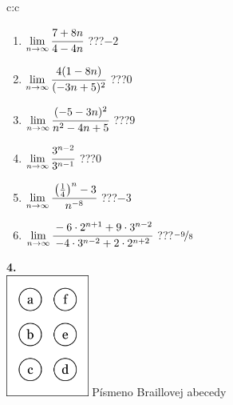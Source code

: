 \documentclass[10pt]{report}
\begin{document}
\begin{tabular}{c:c}
\begin{minipage}[c][104.5mm][t]{0.5\linewidth}
\begin{center}
\begin{minipage}{0.79\linewidth}
\begin{center}
\begin{varwidth}{\linewidth}
\begin{enumerate}
\normalsize
\item $\lim\limits_{n\to\infty}\cfrac{7+8n}{4-4n}$\quad \dotfill\; ???\;\dotfill \quad $-2$
\item $\lim\limits_{n\to\infty}\cfrac{4(1-8n)}{(-3n+5)^2}$\quad \dotfill\; ???\;\dotfill \quad $0$
\item $\lim\limits_{n\to\infty}\cfrac{(-5-3n)^2}{n^2-4n+5}$\quad \dotfill\; ???\;\dotfill \quad $9$
\item $\lim\limits_{n\to\infty}\cfrac{3^{n-2}}{3^{n-1}}$\quad \dotfill\; ???\;\dotfill \quad $0$
\item $\lim\limits_{n\to\infty}\cfrac{\left(\frac{1}{4}\right)^n -3}{n^{-8}}$\quad \dotfill\; ???\;\dotfill \quad $-3$
\item $\lim\limits_{n\to\infty}\cfrac{-6\cdot 2^{n+1}+9\cdot 3^{n-2}}{-4\cdot 3^{n-2}+2\cdot 2^{n+2}}$\quad \dotfill\; ???\;\dotfill \quad $\nicefrac{-9}{8}$
\end{enumerate}
\end{varwidth}
\end{center}
\end{minipage}
\begin{minipage}{0.20\linewidth}
\begin{center}
{\Huge\bfseries 4.} \\[2mm]
\includegraphics[height=40mm]{../images/braille.png}
{\small Písmeno Braillovej abecedy}
\end{center}
\end{minipage}
\end{center}
\end{minipage}
%
\end{tabular}
\newpage
\thispagestyle{empty}
\end{document}
